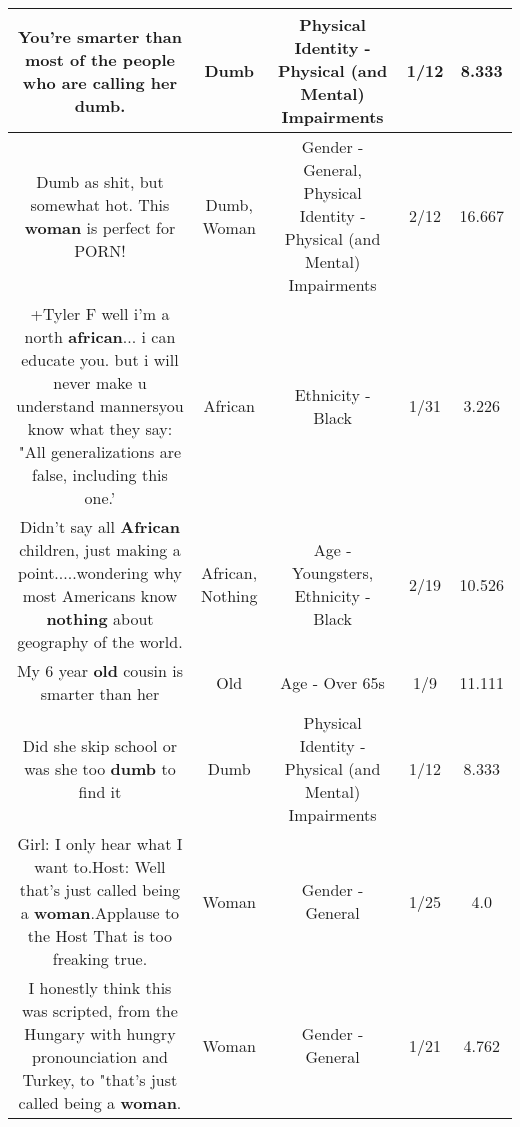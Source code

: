 \documentclass[11pt]{article}
\newlength\mylength
\begin{document}
\begin{center}
\begin{longtable}{|C{.65\mylength}|C{.30\mylength}|C{.12\mylength}|C{.12\mylength}|C{.12\mylength}|}
  \small You're smarter than most of the people who are calling her \textbf{dumb}.\normalsize   & Dumb & Physical Identity - Physical (and Mental) Impairments & 1/12 & 8.333 \\  \hline
  \small Dumb as shit, but somewhat hot. This \textbf{woman} is perfect for PORN!\normalsize   & Dumb, Woman & Gender - General, Physical Identity - Physical (and Mental) Impairments & 2/12 & 16.667 \\  \hline
  \small +Tyler F  well i'm a north \textbf{african}... i can educate you. but i will never make u understand mannersyou know what they say: "All generalizations are false, including this one.'\normalsize   & African & Ethnicity - Black & 1/31 & 3.226 \\  \hline
  \small Didn't say all \textbf{African} children, just making a point.....wondering why most Americans know \textbf{nothing} about geography of the world.\normalsize   & African, Nothing & Age - Youngsters, Ethnicity - Black & 2/19 & 10.526 \\  \hline
  \small My 6 year \textbf{old} cousin is smarter than her\normalsize   & Old & Age - Over 65s & 1/9 & 11.111 \\  \hline
  \small Did she skip school or was she too \textbf{dumb} to find it\normalsize   & Dumb & Physical Identity - Physical (and Mental) Impairments & 1/12 & 8.333 \\  \hline
  \small Girl: I only hear what I want to.Host: Well that's just called being a \textbf{woman}.Applause to the Host That is too freaking true.\normalsize   & Woman & Gender - General & 1/25 & 4.0 \\  \hline
  \small I honestly think this was scripted, from the Hungary with hungry pronounciation and Turkey, to "that's just called being a \textbf{woman}.\normalsize   & Woman & Gender - General & 1/21 & 4.762 \\  \hline

\end{longtable}
\end{center}
\end{document}
